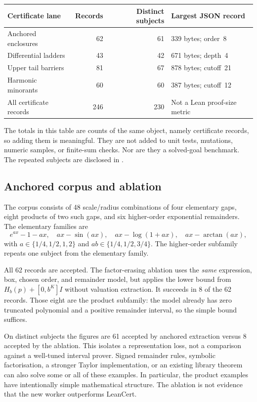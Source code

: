 \documentclass[11pt,a4paper]{article}
\theoremstyle{definition}\newtheorem{definition}[theorem]{Definition}
\newcommand{\code}[1]{\texttt{\detokenize{#1}}}
\begin{document}
\begin{longtable}{@{}P{.32\textwidth}r r P{.26\textwidth}@{}}
\toprule
Certificate lane & Records & Distinct subjects & Largest JSON record \\
\midrule\endhead
Anchored enclosures & 62 & 61 & 339 bytes; order~8 \\
Differential ladders & 43 & 42 & 671 bytes; depth~4 \\
Upper tail barriers & 81 & 67 & 878 bytes; cutoff~21 \\
Harmonic minorants & 60 & 60 & 387 bytes; cutoff~12 \\
\midrule
All certificate records & 246 & 230 & Not a Lean proof-size metric \\
\bottomrule
\end{longtable}

The totals in this table are counts of the same object, namely certificate
records, so adding them is meaningful. They are not added to unit tests,
mutations, numeric samples, or finite-sum checks. Nor are they a solved-goal
benchmark. The repeated subjects are disclosed in
\code{results/duplicate-audit.json}.

\subsection{Anchored corpus and ablation}

The corpus consists of 48 scale/radius combinations of four elementary gaps,
eight products of two such gaps, and six higher-order exponential remainders.
The elementary families are
\[
 e^{ax}-1-ax,\quad ax-\sin(ax),\quad ax-\log(1+ax),\quad ax-\arctan(ax),
\]
with $a\in\{1/4,1/2,1,2\}$ and $ab\in\{1/4,1/2,3/4\}$.
The higher-order subfamily repeats one subject from the elementary family.

All 62 records are accepted. The factor-erasing ablation uses the \emph{same}
expression, box, chosen order, and remainder model, but applies the lower bound
from $H_b(p)+[0,b^K]I$ without valuation extraction. It succeeds in 8 of the 62
records. Those eight are the product subfamily: the model already has zero
truncated polynomial and a positive remainder interval, so the simple bound
suffices.

On distinct subjects the figures are 61 accepted by anchored extraction versus
8 accepted by the ablation. This isolates a representation loss, not a
comparison against a well-tuned interval prover. Signed remainder rules,
symbolic factorisation, a stronger Taylor implementation, or an existing
library theorem can also solve some or all of these examples. In particular,
the product examples have intentionally simple mathematical structure. The
ablation is not evidence that the new worker outperforms LeanCert.
\end{document}
